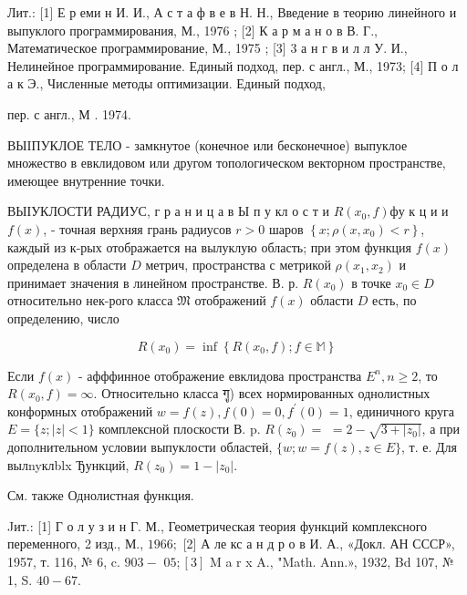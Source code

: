 \documentclass[10pt]{article}
\begin{document}
Лит.: [1] Е р еми н И. И., А с т а ф в е в Н. Н., Введение в теорию линейного и выпуклого программирования, М., 1976 ; [2] К а р м а н о в В. Г., Математическое программирование, М., 1975 ; [3] 3 а н г в и л л У. И., Нелинейное программирование. Единый подход, пер. с англ., М., 1973; [4] П о л а к Э., Численные методы оптимизации. Единый подход,

пер. с англ., М . 1974.



ВЫIПУКЛОЕ ТЕЛО - замкнутое (конечное или бесконечное) выпуклое множество в евклидовом или другом топологическом векторном пространстве, имеющее внутренние точки.



ВЫІУКЛОСТИ РАДИУС, $г$ р а н и ц а в Ы п у кл о с т и $R\left(x_{0}, f\right) ф \mathbf{у}$ к ц и и $f(x)$, - точная верхняя грань радиусов $r>0$ шаров $\left\{x ; \rho\left(x, x_{0}\right)<r\right\}$, каждый из к-рых отображается на вылуклую область; при этом функция $f(x)$ определена в области $D$ метрич, пространства с метрикой $\rho\left(x_{1}, x_{2}\right)$ и принимает значения в линейном пространстве. В. р. $R\left(x_{0}\right)$ в точке $x_{0} \in D$ относительно нек-рого класса $\mathfrak{M}$ отображений $f(x)$ области $D$ есть, по определению, число



\[

R\left(x_{0}\right)=\inf \left\{R\left(x_{0}, f\right) ; f \in \mathbb{M}\right\}

\]



Если $f(x)$ - афффинное отображение евклидова пространства $E^{n}, n \geqslant 2$, то $R\left(x_{0}, f\right)=\infty$. Относительно класса गู) всех нормированных однолистных конформных отображений $w=f(z), f(0)=0, f^{\prime}(0)=1$, единичного круга $E=\{z ;|z|<1\}$ комплексной плоскости В. p. $R\left(z_{0}\right)=$ $=2-\sqrt{3+\left|z_{0}\right|}$, а при дополнительном условии выпуклости областей, $\{w ; w=f(z), z \in E\}$, т. е. Для вылnyклblx Ђункций, $R\left(z_{0}\right)=1-\left|z_{0}\right|$.



См. также Однолистная функция.



Jит.: [1] Г о л у з и н Г. М., Геометрическая теория функций комплексного переменного, 2 изд., М., $1966 ;$ [2] А ле кс а н д р о в И. А., «Докл. АН СССР», 1957, т. 116, № 6, c. $903-$ $05 ;[3]$ M a r x A., "Math. Ann.», 1932, Bd 107, № 1, S. $40-67$.
\end{document}

